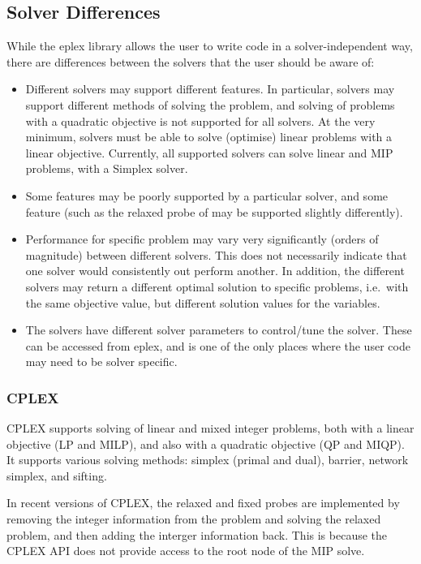 \subsection{Solver Differences}

While the eplex library allows the user to write code in a
solver-independent way, there are differences between the solvers that
the user should be aware of:

\begin{itemize}
\item Different solvers may support different features. In particular,
solvers may support different methods of solving the problem, and solving
 of problems with a quadratic objective is not supported for all solvers.
At the very minimum, solvers must be able to solve (optimise) linear
 problems with a linear objective. Currently, all supported solvers can
 solve linear and MIP problems, with a Simplex solver.
\item Some features may be poorly supported by a particular solver, and
 some feature (such as the relaxed probe of 
 may be
supported slightly differently).
\item Performance for specific problem may vary very significantly (orders
of magnitude) between different solvers. This does not necessarily indicate 
that one solver would consistently out perform another. In addition, the
different solvers may return a different optimal solution to specific
problems, i.e.\ with the same objective value, but different solution
values for the variables.
\item The solvers have different solver parameters to control/tune the
solver. These can be accessed from eplex, and is one of the only places
 where the user code may need to be solver specific.
\end{itemize}

\subsubsection{CPLEX}
CPLEX supports solving of linear and mixed integer problems, both with a
linear objective (LP and MILP), and also with a quadratic objective (QP and
MIQP). It supports various solving methods: simplex (primal and dual),
barrier, network simplex, and sifting. 

In recent versions of CPLEX, the relaxed and fixed probes are implemented 
by removing
the integer information from the problem and solving the relaxed problem,
and then adding the interger information back. This is because the CPLEX
API does not provide access to the root node of the MIP solve.

